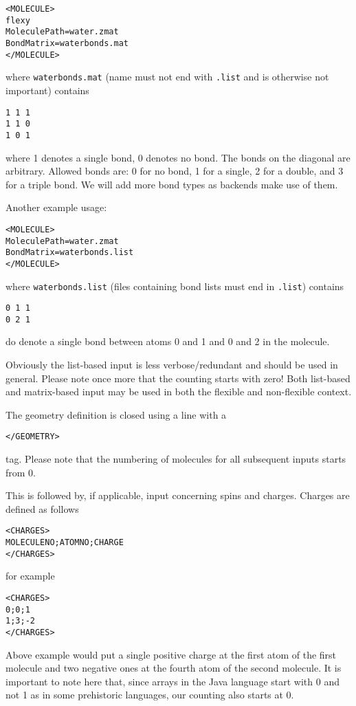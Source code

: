 \documentclass[a4paper,10pt]{scrbook}
\begin{document}
\begin{verbatim}
<MOLECULE>
flexy
MoleculePath=water.zmat
BondMatrix=waterbonds.mat
</MOLECULE>
\end{verbatim}

where \texttt{waterbonds.mat} (name must not end with \texttt{.list} and is
otherwise not important) contains

\begin{verbatim}
1 1 1
1 1 0
1 0 1
\end{verbatim}

where 1 denotes a single bond, 0 denotes no bond. The bonds on the diagonal are 
arbitrary. Allowed bonds are: 0 for no bond, 1 for a single, 2 for a double, and
3 for a triple bond. We will add more bond types as backends make use of them.

Another example usage:
\begin{verbatim}
<MOLECULE>
MoleculePath=water.zmat
BondMatrix=waterbonds.list
</MOLECULE>
\end{verbatim}

where \texttt{waterbonds.list} (files containing bond lists must end in
\texttt{.list}) contains

\begin{verbatim}
0 1 1
0 2 1
\end{verbatim}

do denote a single bond between atoms 0 and 1 and 0 and 2 in the molecule.

Obviously the list-based input is less verbose/redundant and should be used in
general. Please note once more that the counting starts with zero! Both
list-based and matrix-based input may be used in both the flexible and
non-flexible context.

The geometry definition is closed using a line with a 
\begin{verbatim}
</GEOMETRY>
\end{verbatim}
tag. Please note that the numbering of molecules for all subsequent inputs
starts from 0.

This is followed by, if applicable, input concerning spins and charges. Charges
are defined as follows
\begin{verbatim}
<CHARGES>
MOLECULENO;ATOMNO;CHARGE
</CHARGES>
\end{verbatim}
for example
\begin{verbatim}
<CHARGES>
0;0;1
1;3;-2
</CHARGES>
\end{verbatim}
Above example would put a single positive charge at the first atom of the first
molecule and two negative ones at the fourth atom of the second molecule. It is
important to note here that, since arrays in the Java language start with 0 and
not 1 as in some prehistoric languages, our counting also starts at 0.
\end{document}
